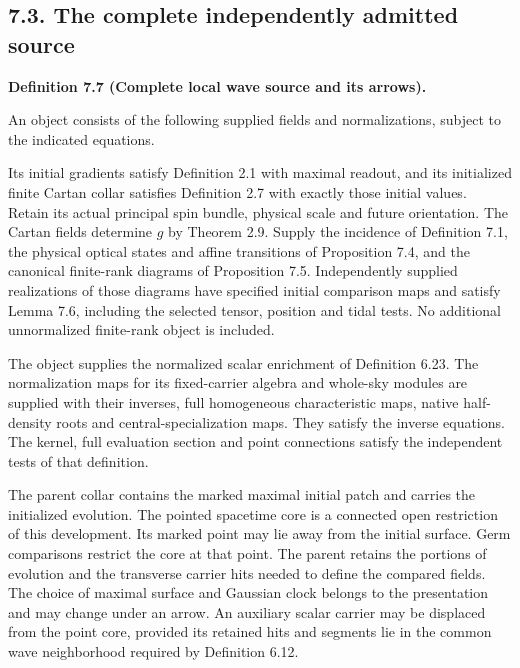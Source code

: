 \documentclass[
  english,
  11pt,
  reqno]{amsart}
\makeatletter
\newcommand{\paperdisplaynext}{%
  \let\paper@savedstartsection\@startsection
  \def\@startsection##1##2##3##4##5##6{%
    \let\@startsection\paper@savedstartsection
    \@tempskipa ##5\relax
    \ifdim\@tempskipa<\z@
      \def\paper@afterskip{.35\baselineskip}%
    \else
      \def\paper@afterskip{##5}%
    \fi
    \@startsection{##1}{##2}{##3}{##4}{\paper@afterskip}{##6}}}
\newcommand{\paperdisplaysection}{\paperdisplaynext\subsection}
\newcommand{\pandocstatementheading}[1]{%
  \par\if@nobreak\else
    \addpenalty{\@beginparpenalty}%
    \addvspace{.5\baselineskip plus .2\baselineskip minus .2\baselineskip}%
  \fi
  {\normalfont\bfseries #1\par}%
  \nobreak\@afterindenttrue\@afterheading
}
\let\paper@displaysection\paperdisplaysection
\renewcommand{\paperdisplaysection}[1]{%
  \let\paper@savedhangfrom\@hangfrom
  \long\def\@hangfrom##1##2{%
    \paper@savedhangfrom{##1}{\paper@headingparagraph##2}}%
  \paper@displaysection{#1}%
  \let\@hangfrom\paper@savedhangfrom}
\makeatother
\begin{document}
\paperdisplaysection{7.3. The complete independently admitted
source}\label{the-complete-independently-admitted-source}\label{sec:online-independent-full-wave-source}

\pandocstatementheading{\leavevmode{}\label{def:online-complete-independent-wave-source}Definition 7.7 (Complete local wave source and its arrows).}

An object consists of the following supplied fields and normalizations,
subject to the indicated equations.

Its initial gradients satisfy Definition 2.1 with maximal readout, and
its initialized finite Cartan collar satisfies Definition 2.7 with
exactly those initial values. Retain its actual principal spin bundle,
physical scale and future orientation. The Cartan fields determine \(g\)
by Theorem 2.9. Supply the incidence of Definition 7.1, the physical
optical states and affine transitions of Proposition 7.4, and the
canonical finite-rank diagrams of Proposition 7.5. Independently
supplied realizations of those diagrams have specified initial
comparison maps and satisfy Lemma 7.6, including the selected tensor,
position and tidal tests. No additional unnormalized finite-rank object
is included.

The object supplies the normalized scalar enrichment of Definition 6.23.
The normalization maps for its fixed-carrier algebra and whole-sky
modules are supplied with their inverses, full homogeneous
characteristic maps, native half-density roots and
central-specialization maps. They satisfy the inverse equations. The
kernel, full evaluation section and point connections satisfy the
independent tests of that definition.

The parent collar contains the marked maximal initial patch and carries
the initialized evolution. The pointed spacetime core is a connected
open restriction of this development. Its marked point may lie away from
the initial surface. Germ comparisons restrict the core at that point.
The parent retains the portions of evolution and the transverse carrier
hits needed to define the compared fields. The choice of maximal surface
and Gaussian clock belongs to the presentation and may change under an
arrow. An auxiliary scalar carrier may be displaced from the point core,
provided its retained hits and segments lie in the common wave
neighborhood required by Definition 6.12.
\end{document}
